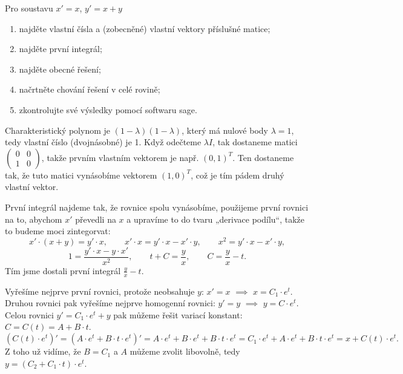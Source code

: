 \documentclass[12pt]{article}					%
\begin{document}
\begin{priklad}
	Pro soustavu $x' = x$, $y' = x + y$

	\begin{enumerate}
		\item najděte vlastní čísla a (zobecněné) vlastní vektory příslušné matice;
		\item najděte první integrál;
		\item najděte obecné řešení;
		\item načrtněte chování řešení v celé rovině;
		\item zkontrolujte své výsledky pomocí softwaru sage.
	\end{enumerate}

	\begin{reseni}[1.]
		Charakteristický polynom je $(1 - \lambda)(1 - \lambda)$, který má nulové body $\lambda = 1$, tedy vlastní číslo (dvojnásobné) je 1.
		Když odečteme $\lambda I$, tak dostaneme matici $\begin{pmatrix} 0 & 0 \\ 1 & 0 \end{pmatrix}$, takže prvním vlastním vektorem je např. $(0, 1)^T$. Ten dostaneme tak, že tuto matici vynásobíme vektorem $(1, 0)^T$, což je tím pádem druhý vlastní vektor.
	\end{reseni}

	\begin{reseni}[2.]
		První integrál najdeme tak, že rovnice spolu vynásobíme, použijeme první rovnici na to, abychom $x'$ převedli na $x$ a upravíme to do tvaru „derivace podílu“, takže to budeme moci zintegorvat:
		$$ x'·(x + y) = y'·x, \qquad x'·x = y'·x - x'·y, \qquad x^2 = y'·x - x'·y, $$
		$$ 1 = \frac{y'·x - y·x'}{x^2}, \qquad t + C = \frac{y}{x}, \qquad C = \frac{y}{x} - t. $$
		Tím jsme dostali první integrál $\frac{y}{x} - t$.
	\end{reseni}

	\begin{reseni}[3.]
		Vyřešíme nejprve první rovnici, protože neobsahuje $y$: $x' = x$ $\implies$ $x = C_1·e^t$. Druhou rovnici pak vyřešíme nejprve homogenní rovnici: $y' = y$ $\implies$ $y = C·e^t$. Celou rovnici $y' = C_1·e^t + y$ pak můžeme řešit variací konstant: $C = C(t) = A + B·t$.
		$$ (C(t)·e^t)' = (A·e^t + B·t·e^t)' = A·e^t + B·e^t + B·t·e^t = C_1·e^t + A·e^t + B·t·e^{t} = x + C(t)·e^t. $$
		Z toho už vidíme, že $B = C_1$ a $A$ můžeme zvolit libovolně, tedy $y = (C_2 + C_1·t)·e^t$.
	\end{reseni}


\end{priklad}
\end{document}
